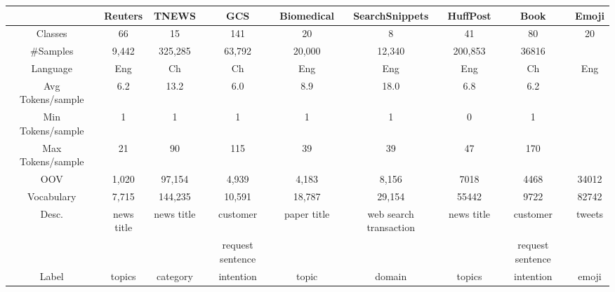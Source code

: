 \begin{table}[th]
	\scriptsize
	\centering
	\begin{threeparttable}
	\begin{tabular}{ccccccccc}
		\toprule
		& Reuters\tnote{1}  & TNEWS \tnote{2}   & GCS\tnote{3} & Biomedical\tnote{4}  & SearchSnippets\tnote{4}  & HuffPost\tnote{5} & Book\tnote{6} & Emoji\tnote{7} \\ \hline
		Classes       & 66                   & 15         & 141           &20&8       & 41 & 80  & 20   \\
		\#Samples     & 9,442            & 325,285    & 63,792           &20,000&12,340        &200,853&36816&        \\
		Language      & Eng               & Ch         & Ch           & Eng          & Eng    &Eng&Ch& Eng     \\
		Avg Tokens/sample & 6.2              & 13.2        &     6.0     &8.9&18.0    &6.8&6.2&      \\
		Min Tokens/sample & 1 & 1 & 1 &1&1         &0&1&\\
		Max Tokens/sample & 21 & 90 & 115 &39&39    &47&170& \\

		OOV &1,020 &97,154&4,939&4,183&8,156    &7018&4468&34012\\
		Vocabulary& 7,715&144,235&10,591&18,787&29,154     &55442&9722&82742\\
		Desc.         & news title  & news title & customer &paper title&web search transaction &news title&customer&tweets 
   \\ 
	& & &request sentence &  &  &&request sentence &\\
		Label         & topics             & category   & intention                 &topic&domain      &topics&intention&emoji\\
		\bottomrule              
	\end{tabular}



\end{threeparttable}
\end{table}
